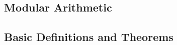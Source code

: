 
\subsection{Modular Arithmetic}
\label{sec:modular-arithmetic}

\subsection*{Basic Definitions and Theorems}
